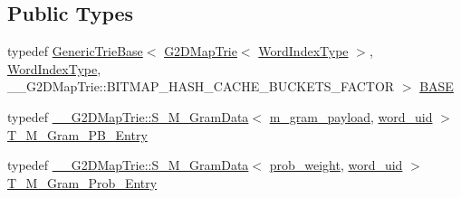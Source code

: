 \subsection*{Public Types}
\begin{DoxyCompactItemize}
\item 
typedef \hyperlink{classuva_1_1smt_1_1bpbd_1_1server_1_1lm_1_1_generic_trie_base}{Generic\+Trie\+Base}$<$ \hyperlink{classuva_1_1smt_1_1bpbd_1_1server_1_1lm_1_1_g2_d_map_trie}{G2\+D\+Map\+Trie}$<$ \hyperlink{classuva_1_1smt_1_1bpbd_1_1server_1_1lm_1_1_word_index_trie_base_a77ee32bf3a9f8a89558bda4f2031200c}{Word\+Index\+Type} $>$, \hyperlink{classuva_1_1smt_1_1bpbd_1_1server_1_1lm_1_1_word_index_trie_base_a77ee32bf3a9f8a89558bda4f2031200c}{Word\+Index\+Type}, \+\_\+\+\_\+\+G2\+D\+Map\+Trie\+::\+B\+I\+T\+M\+A\+P\+\_\+\+H\+A\+S\+H\+\_\+\+C\+A\+C\+H\+E\+\_\+\+B\+U\+C\+K\+E\+T\+S\+\_\+\+F\+A\+C\+T\+O\+R $>$ \hyperlink{classuva_1_1smt_1_1bpbd_1_1server_1_1lm_1_1_g2_d_map_trie_a68a1f3a5cfa63607571c8e7a4261122f}{B\+A\+S\+E}
\item 
typedef \hyperlink{structuva_1_1smt_1_1bpbd_1_1server_1_1lm_1_1_____g2_d_map_trie_1_1_s___m___gram_data}{\+\_\+\+\_\+\+G2\+D\+Map\+Trie\+::\+S\+\_\+\+M\+\_\+\+Gram\+Data}$<$ \hyperlink{namespaceuva_1_1smt_1_1bpbd_1_1server_1_1lm_1_1m__grams_a1422aa6b3f3cb9377916d20e9bf16c0a}{m\+\_\+gram\+\_\+payload}, \hyperlink{namespaceuva_1_1smt_1_1bpbd_1_1server_a6bfe45ba344d65a7fdd7d26156328ddc}{word\+\_\+uid} $>$ \hyperlink{classuva_1_1smt_1_1bpbd_1_1server_1_1lm_1_1_g2_d_map_trie_a26c51a5556b8312e561acafa825aee31}{T\+\_\+\+M\+\_\+\+Gram\+\_\+\+P\+B\+\_\+\+Entry}
\item 
typedef \hyperlink{structuva_1_1smt_1_1bpbd_1_1server_1_1lm_1_1_____g2_d_map_trie_1_1_s___m___gram_data}{\+\_\+\+\_\+\+G2\+D\+Map\+Trie\+::\+S\+\_\+\+M\+\_\+\+Gram\+Data}$<$ \hyperlink{namespaceuva_1_1smt_1_1bpbd_1_1server_a01e9ea4de9c226f4464862e84ff0bbcc}{prob\+\_\+weight}, \hyperlink{namespaceuva_1_1smt_1_1bpbd_1_1server_a6bfe45ba344d65a7fdd7d26156328ddc}{word\+\_\+uid} $>$ \hyperlink{classuva_1_1smt_1_1bpbd_1_1server_1_1lm_1_1_g2_d_map_trie_abaad3a9ae2c2373d42e966e841bfede7}{T\+\_\+\+M\+\_\+\+Gram\+\_\+\+Prob\+\_\+\+Entry}
\end{DoxyCompactItemize}
